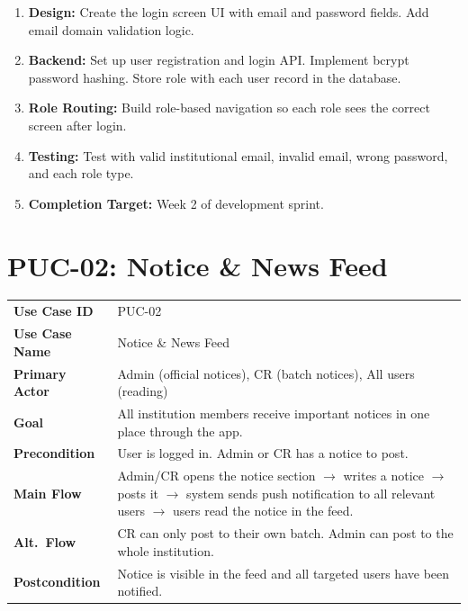 \documentclass[12pt,a4paper]{article}
\begin{document}
\begin{tcolorbox}[planbox, title={Completion Plan --- PUC-01}]
\begin{enumerate}[leftmargin=*, label=\textbf{Step \arabic*:}, itemsep=4pt]
  \item \textbf{Design:} Create the login screen UI with email and password fields. Add email domain validation logic.
  \item \textbf{Backend:} Set up user registration and login API. Implement bcrypt password hashing. Store role with each user record in the database.
  \item \textbf{Role Routing:} Build role-based navigation so each role sees the correct screen after login.
  \item \textbf{Testing:} Test with valid institutional email, invalid email, wrong password, and each role type.
  \item \textbf{Completion Target:} Week 2 of development sprint.
\end{enumerate}
\end{tcolorbox}
\newpage
\section{PUC-02: Notice \& News Feed}

\begin{tcolorbox}[pucbox, title={Product Use Case --- PUC-02}]
\begin{tabularx}{\linewidth}{p{3.5cm} X}
\textbf{Use Case ID}    & PUC-02 \\
\textbf{Use Case Name}  & Notice \& News Feed \\
\textbf{Primary Actor}  & Admin (official notices), CR (batch notices), All users (reading) \\
\textbf{Goal}           & All institution members receive important notices in one place through the app. \\
\textbf{Precondition}   & User is logged in. Admin or CR has a notice to post. \\
\textbf{Main Flow}      & Admin/CR opens the notice section $\rightarrow$ writes a notice $\rightarrow$ posts it $\rightarrow$ system sends push notification to all relevant users $\rightarrow$ users read the notice in the feed. \\
\textbf{Alt.\ Flow}     & CR can only post to their own batch. Admin can post to the whole institution. \\
\textbf{Postcondition}  & Notice is visible in the feed and all targeted users have been notified. \\
\end{tabularx}
\end{tcolorbox}
\end{document}
